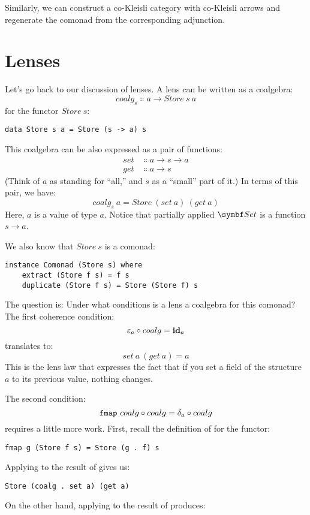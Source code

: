 Similarly, we can construct a co-Kleisli category with co-Kleisli arrows
and regenerate the comonad from the corresponding adjunction.

\section{Lenses}

Let's go back to our discussion of lenses. A lens can be written as a
coalgebra:
\[coalg_s \Colon a \to Store\ s\ a\]
for the functor $Store\ s$:

\begin{Verbatim}
data Store s a = Store (s -> a) s
\end{Verbatim}
This coalgebra can be also expressed as a pair of functions:
\begin{align*}
set &\Colon a \to s \to a \\
get &\Colon a \to s
\end{align*}
(Think of $a$ as standing for ``all,'' and $s$ as a
``small'' part of it.) In terms of this pair, we have:
\[coalg_s\ a = Store\ (set\ a)\ (get\ a)\]
Here, $a$ is a value of type $a$. Notice that partially
applied $\Set$ is a function $s \to a$.

We also know that $Store\ s$ is a comonad:

\begin{Verbatim}
instance Comonad (Store s) where
    extract (Store f s) = f s
    duplicate (Store f s) = Store (Store f) s
\end{Verbatim}
The question is: Under what conditions is a lens a coalgebra for this
comonad? The first coherence condition:
\[\varepsilon_a \circ coalg = \idarrow[a]\]
translates to:
\[set\ a\ (get\ a) = a\]
This is the lens law that expresses the fact that if you set a field of
the structure $a$ to its previous value, nothing changes.

The second condition:
\[\code{fmap}\ coalg \circ coalg = \delta_a \circ coalg\]
requires a little more work. First, recall the definition of
 for the  functor:

\begin{Verbatim}
fmap g (Store f s) = Store (g . f) s
\end{Verbatim}
Applying  to the result of  gives us:

\begin{Verbatim}
Store (coalg . set a) (get a)
\end{Verbatim}
On the other hand, applying  to the result of
 produces:

